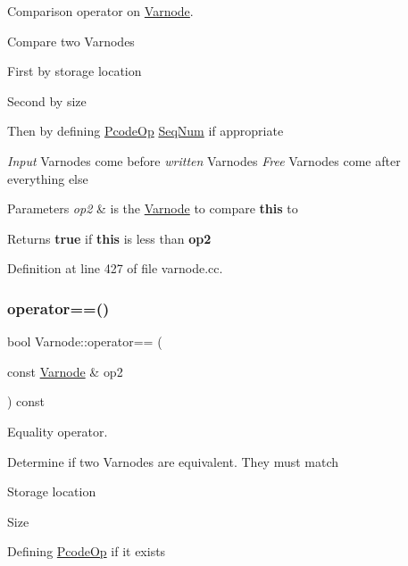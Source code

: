 Comparison operator on \mbox{\hyperlink{class_varnode}{Varnode}}. 

Compare two Varnodes
\begin{DoxyItemize}
\item First by storage location
\item Second by size
\item Then by defining \mbox{\hyperlink{class_pcode_op}{Pcode\+Op}} \mbox{\hyperlink{class_seq_num}{Seq\+Num}} if appropriate
\end{DoxyItemize}

{\itshape Input} Varnodes come before {\itshape written} Varnodes {\itshape Free} Varnodes come after everything else 
\begin{DoxyParams}{Parameters}
{\em op2} & is the \mbox{\hyperlink{class_varnode}{Varnode}} to compare {\bfseries{this}} to \\
\hline
\end{DoxyParams}
\begin{DoxyReturn}{Returns}
{\bfseries{true}} if {\bfseries{this}} is less than {\bfseries{op2}} 
\end{DoxyReturn}


Definition at line 427 of file varnode.\+cc.

\mbox{\label{class_varnode_afab4c9a244385f9c849ead46102b69d8}} 
\subsubsection{\texorpdfstring{operator==()}{operator==()}}
{\footnotesize\ttfamily bool Varnode\+::operator== (\begin{DoxyParamCaption}\item[{const \mbox{\hyperlink{class_varnode}{Varnode}} \&}]{op2 }\end{DoxyParamCaption}) const}



Equality operator. 

Determine if two Varnodes are equivalent. They must match
\begin{DoxyItemize}
\item Storage location
\item Size
\item Defining \mbox{\hyperlink{class_pcode_op}{Pcode\+Op}} if it exists
\end{DoxyItemize}


